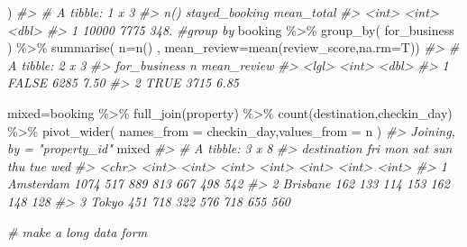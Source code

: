\documentclass[
]{article}
\newenvironment{Shaded}{\begin{snugshade}}{\end{snugshade}}
\newcommand{\AttributeTok}[1]{\textcolor[rgb]{0.77,0.63,0.00}{#1}}
\newcommand{\CommentTok}[1]{\textcolor[rgb]{0.56,0.35,0.01}{\textit{#1}}}
\newcommand{\FunctionTok}[1]{\textcolor[rgb]{0.00,0.00,0.00}{#1}}
\newcommand{\NormalTok}[1]{#1}
\newcommand{\OtherTok}[1]{\textcolor[rgb]{0.56,0.35,0.01}{#1}}
\newcommand{\SpecialCharTok}[1]{\textcolor[rgb]{0.00,0.00,0.00}{#1}}
\begin{document}
\begin{Shaded}
\begin{Highlighting}[]
\NormalTok{  )}
\CommentTok{\#\textgreater{} \# A tibble: 1 x 3}
\CommentTok{\#\textgreater{}   \textasciigrave{}n()\textasciigrave{} stayed\_booking mean\_total}
\CommentTok{\#\textgreater{}   \textless{}int\textgreater{}          \textless{}int\textgreater{}      \textless{}dbl\textgreater{}}
\CommentTok{\#\textgreater{} 1 10000           7775       348.}
\CommentTok{\#group by}
\NormalTok{booking }\SpecialCharTok{\%\textgreater{}\%} 
  \FunctionTok{group\_by}\NormalTok{(}
\NormalTok{    for\_business}
\NormalTok{  ) }\SpecialCharTok{\%\textgreater{}\%} 
  \FunctionTok{summarise}\NormalTok{(}
  \AttributeTok{n=}\FunctionTok{n}\NormalTok{()}
\NormalTok{, }\AttributeTok{mean\_review=}\FunctionTok{mean}\NormalTok{(review\_score,}\AttributeTok{na.rm=}\NormalTok{T))}
\CommentTok{\#\textgreater{} \# A tibble: 2 x 3}
\CommentTok{\#\textgreater{}   for\_business     n mean\_review}
\CommentTok{\#\textgreater{}   \textless{}lgl\textgreater{}        \textless{}int\textgreater{}       \textless{}dbl\textgreater{}}
\CommentTok{\#\textgreater{} 1 FALSE         6285        7.50}
\CommentTok{\#\textgreater{} 2 TRUE          3715        6.85}

\NormalTok{mixed}\OtherTok{=}\NormalTok{booking }\SpecialCharTok{\%\textgreater{}\%} 
  \FunctionTok{full\_join}\NormalTok{(property) }\SpecialCharTok{\%\textgreater{}\%} 
  \FunctionTok{count}\NormalTok{(destination,checkin\_day) }\SpecialCharTok{\%\textgreater{}\%} 
  \FunctionTok{pivot\_wider}\NormalTok{(}
    \AttributeTok{names\_from =}\NormalTok{ checkin\_day,}\AttributeTok{values\_from =}\NormalTok{ n}
\NormalTok{  )}
\CommentTok{\#\textgreater{} Joining, by = "property\_id"}
\NormalTok{mixed }
\CommentTok{\#\textgreater{} \# A tibble: 3 x 8}
\CommentTok{\#\textgreater{}   destination   fri   mon   sat   sun   thu   tue   wed}
\CommentTok{\#\textgreater{}   \textless{}chr\textgreater{}       \textless{}int\textgreater{} \textless{}int\textgreater{} \textless{}int\textgreater{} \textless{}int\textgreater{} \textless{}int\textgreater{} \textless{}int\textgreater{} \textless{}int\textgreater{}}
\CommentTok{\#\textgreater{} 1 Amsterdam    1074   517   889   813   667   498   542}
\CommentTok{\#\textgreater{} 2 Brisbane      162   133   114   153   162   148   128}
\CommentTok{\#\textgreater{} 3 Tokyo         451   718   322   576   718   655   560}

\CommentTok{\# make a long data form}


\end{Highlighting}
\end{Shaded}
\end{document}

